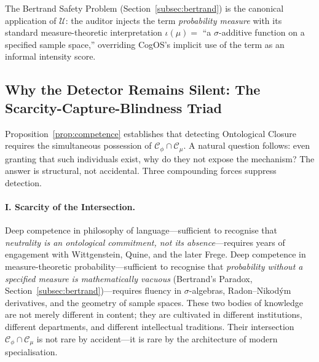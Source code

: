\documentclass[11pt,a4paper]{article}
\theoremstyle{definition}
\theoremstyle{plain}
\theoremstyle{remark}
\begin{document}
The Bertrand Safety Problem (Section~\cref{subsec:bertrand}) is the canonical application
of $\mathcal{U}$: the auditor injects the term \emph{probability measure} with its
standard measure-theoretic interpretation $\iota(\mu) = $ ``a $\sigma$-additive function
on a specified sample space,'' overriding CogOS's implicit use of the term as an informal
intensity score.


\subsection{Why the Detector Remains Silent: The Scarcity-Capture-Blindness Triad}
\label{apx:scarcity}

Proposition~\cref{prop:competence} establishes that detecting Ontological Closure
requires the simultaneous possession of $\mathcal{C}_\phi \cap \mathcal{C}_\mu$.
A natural question follows: even granting that such individuals exist, why do they
not expose the mechanism?  The answer is structural, not accidental.
Three compounding forces suppress detection.

\paragraph{I. Scarcity of the Intersection.}
Deep competence in philosophy of language---sufficient to recognise that
\emph{neutrality is an ontological commitment, not its absence}---requires years
of engagement with Wittgenstein, Quine, and the later Frege.
Deep competence in measure-theoretic probability---sufficient to recognise that
\emph{probability without a specified measure is mathematically vacuous} (Bertrand's
Paradox, Section~\cref{subsec:bertrand})---requires fluency in $\sigma$-algebras,
Radon--Nikod\'{y}m derivatives, and the geometry of sample spaces.
These two bodies of knowledge are not merely different in content; they are
cultivated in different institutions, different departments, and different
intellectual traditions.  Their intersection $\mathcal{C}_\phi \cap \mathcal{C}_\mu$
is not rare by accident---it is rare by the architecture of modern specialisation.
\end{document}
